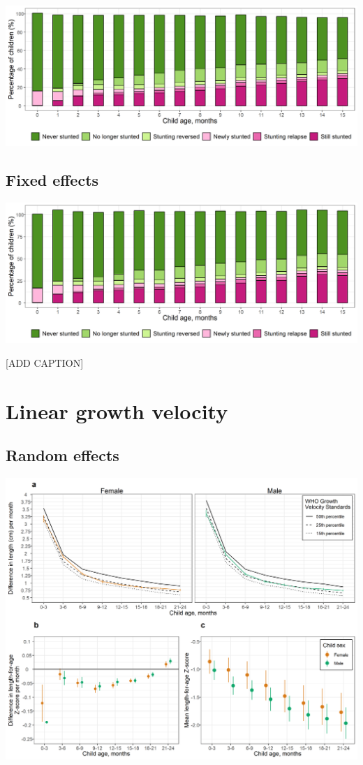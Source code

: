 \documentclass[9pt,]{book}
\begin{document}
\includegraphics[width=41.67in]{figure-copies/fig-stunt-2-flow-overall--allage-re}

\hypertarget{fixed-effects-3}{%
\subsection{Fixed effects}\label{fixed-effects-3}}

\includegraphics[width=41.67in]{figure-copies/fig-stunt-2-flow-overall--allage-fe}

{[}ADD CAPTION{]}

\hypertarget{linear-growth-velocity-1}{%
\section{Linear growth velocity}\label{linear-growth-velocity-1}}

\hypertarget{random-effects-3}{%
\subsection{Random effects}\label{random-effects-3}}

\includegraphics[width=41.67in]{figure-copies/fig-stunt-2-vel-overall--allage-primary}
\end{document}
